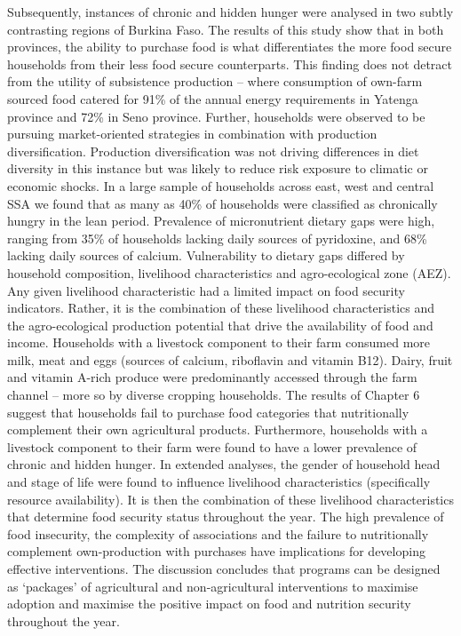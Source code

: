 Subsequently, instances of chronic and hidden hunger were analysed in two subtly contrasting regions of Burkina Faso. The results of this study show that in both provinces, the ability to purchase food is what differentiates the more food secure households from their less food secure counterparts. This finding does not detract from the utility of subsistence production -- where consumption of own-farm sourced food catered for 91\% of the annual energy requirements in Yatenga province and 72\% in Seno province. Further, households were observed to be pursuing market-oriented strategies in combination with production diversification. Production diversification was not driving differences in diet diversity in this instance but was likely to reduce risk exposure to climatic or economic shocks.
In a large sample of households across east, west and central SSA we found that as many as 40\% of households were classified as chronically hungry in the lean period. Prevalence of micronutrient dietary gaps were high, ranging from 35\% of households lacking daily sources of pyridoxine, and 68\% lacking daily sources of calcium. Vulnerability to dietary gaps differed by household composition, livelihood characteristics and agro-ecological zone (AEZ). Any given livelihood characteristic had a limited impact on food security indicators. Rather, it is the combination of these livelihood characteristics and the agro-ecological production potential that drive the availability of food and income. Households with a livestock component to their farm consumed more milk, meat and eggs (sources of calcium, riboflavin and vitamin B12). Dairy, fruit and vitamin A-rich produce were predominantly accessed through the farm channel -- more so by diverse cropping households. The results of Chapter 6 suggest that households fail to purchase food categories that nutritionally complement their own agricultural products. Furthermore, households with a livestock component to their farm were found to have a lower prevalence of chronic and hidden hunger.
In extended analyses, the gender of household head and stage of life were found to influence livelihood characteristics (specifically resource availability). It is then the combination of these livelihood characteristics that determine food security status throughout the year. The high prevalence of food insecurity, the complexity of associations and the failure to nutritionally complement own-production with purchases have implications for developing effective interventions. The discussion concludes that programs can be designed as `packages' of agricultural and non-agricultural interventions to maximise adoption and maximise the positive impact on food and nutrition security throughout the year.

\normalsize
